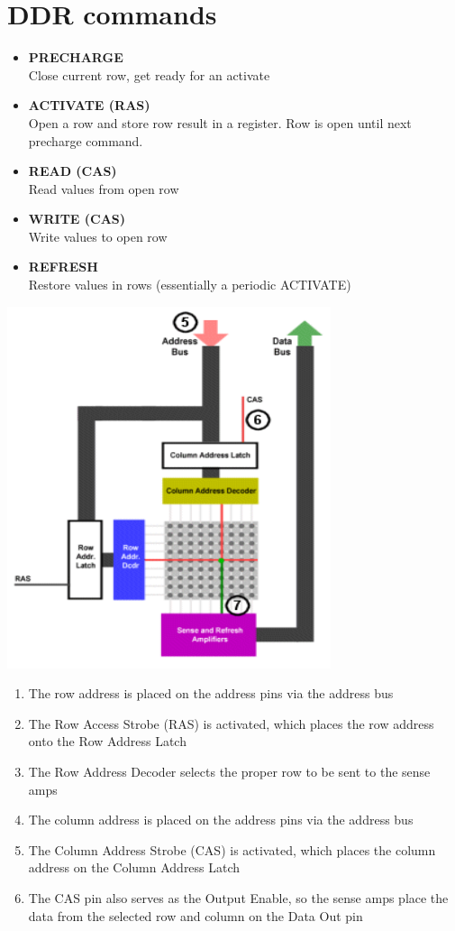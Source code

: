 \section{DDR commands}
\begin{itemize}
    \item \textbf{PRECHARGE}\\
    Close current row, get ready for an activate
    \item \textbf{ACTIVATE (RAS)}\\
    Open a row and store row result in a register.
    Row is open until next precharge command.
    \item \textbf{READ (CAS)}\\
    Read values from open row
    \item \textbf{WRITE (CAS)}\\
    Write values to open row
    \item \textbf{REFRESH}\\
    Restore values in rows (essentially a periodic ACTIVATE)
\end{itemize}

\includegraphics[width=.6\textwidth]{images/DRAM_memory_structure.png}
\begin{enumerate}
    \item The row address is placed on the address pins via the address bus
    \item The Row Access Strobe (RAS) is activated, which places the row address onto the Row Address Latch
    \item The Row Address Decoder selects the proper row to be sent to the sense amps
    \item The column address is placed on the address pins via the address bus
    \item The Column Address Strobe (CAS) is activated, which places the column address on the Column Address Latch
    \item The CAS pin also serves as the Output Enable, so the sense amps place the data from the selected row and column on the Data Out pin
\end{enumerate}

